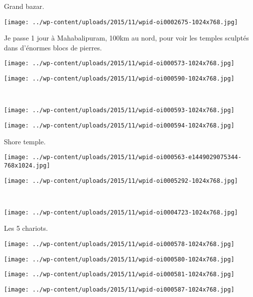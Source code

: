  Grand bazar. 
\begin{center} \texttt{[image: ../wp-content/uploads/2015/11/wpid-oi0002675-1024x768.jpg]} \end{center}
\vspace{-\topsep}
\pagebreak
 
 Je passe 1 jour à Mahabalipuram, 100km au nord, pour voir les temples sculptés dans d'énormes blocs de pierres. 
\begin{center} \texttt{[image: ../wp-content/uploads/2015/11/wpid-oi000573-1024x768.jpg]} \end{center}
\begin{center} \texttt{[image: ../wp-content/uploads/2015/11/wpid-oi000590-1024x768.jpg]} \end{center}
\vspace{-\topsep}
\vspace{-2.75mm}
\pagebreak

~\\
\begin{center} \texttt{[image: ../wp-content/uploads/2015/11/wpid-oi000593-1024x768.jpg]} \end{center}
\begin{center} \texttt{[image: ../wp-content/uploads/2015/11/wpid-oi000594-1024x768.jpg]} \end{center}
\vspace{-\topsep}
\vspace{-2.75mm}
\pagebreak
 
 Shore temple. 
\begin{center} \texttt{[image: ../wp-content/uploads/2015/11/wpid-oi000563-e1449029075344-768x1024.jpg]} \end{center} 
\begin{center} \texttt{[image: ../wp-content/uploads/2015/11/wpid-oi0005292-1024x768.jpg]} \end{center}
\vspace{-\topsep}
\vspace{-0.75mm}
\pagebreak

~\\
\begin{center} \texttt{[image: ../wp-content/uploads/2015/11/wpid-oi0004723-1024x768.jpg]} \end{center}

 Les 5 chariots. 
\begin{center} \texttt{[image: ../wp-content/uploads/2015/11/wpid-oi000578-1024x768.jpg]} \end{center}
\begin{center} \texttt{[image: ../wp-content/uploads/2015/11/wpid-oi000580-1024x768.jpg]} \end{center}
\begin{center} \texttt{[image: ../wp-content/uploads/2015/11/wpid-oi000581-1024x768.jpg]} \end{center}
\begin{center} \texttt{[image: ../wp-content/uploads/2015/11/wpid-oi000587-1024x768.jpg]} \end{center}


